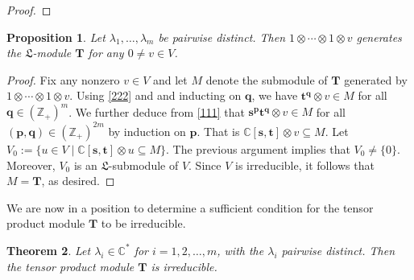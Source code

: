 \documentclass[12pt,leqno,amscd,amsfonts,amssymb]{amsart}
\def\b{\beta}
\def\r{\gamma}
\def\Z{\mathbb{Z}}
\def\C{\mathbb{C}}
\numberwithin{equation}{section}
\newtheorem{theo}{Theorem}[section]
\newtheorem{prop}[theo]{Proposition}
\begin{document}
\begin{proof}
\end{proof}
\begin{prop}\label{prop3}
Let $\lambda_1, \ldots, \lambda_m$ be pairwise distinct. Then $1\otimes\cdots \otimes 1\otimes v$ generates the  $\mathfrak L$-module $\bm{T}$ for  any $0\neq v\in V$.
\end{prop}
\begin{proof}
Fix any nonzero $v\in V$ and let $M$ denote the submodule of $\bm{T}$ generated by $1\otimes\cdots \otimes 1\otimes v$. Using \eqref{222} and and inducting on  $\mathbf{q}$, we have $\mathbf{t}^{\mathbf{q}}\otimes v\in M$ for all $\mathbf{q}\in(\Z_+)^m$. We further deduce from  \eqref{111} that $\mathbf{s}^{\mathbf{p}}\mathbf{t}^{\mathbf{q}}\otimes v\in M$ for all $(\mathbf{p}, \mathbf{q})\in(\Z_+)^{2m}$ by induction on $\mathbf{p}$. That is $\C[\mathbf{s}, \mathbf{t}]\otimes v\subseteq M$. Let $V_0:=\{u\in V\mid \C[\mathbf{s}, \mathbf{t}]\otimes u\subseteq M\}$. The previous argument implies that $V_0\neq\{0\}$.  Moreover, $V_0$ is an $\mathfrak L$-submodule of  $V$. Since  $V$ is irreducible, it follows that $M=\bm{T}$, as desired.
\end{proof}
We are now in a position to determine a sufficient condition for the tensor product module $\bm{T}$ to be irreducible.	
\begin{theo}\label{theo1}
Let $\lambda_i\in\C^*$ for $i=1, 2, \ldots, m$,  with the $\lambda_i$ pairwise distinct. Then the tensor product module $\bm{T}$ is irreducible.
\end{theo}
\end{document}
